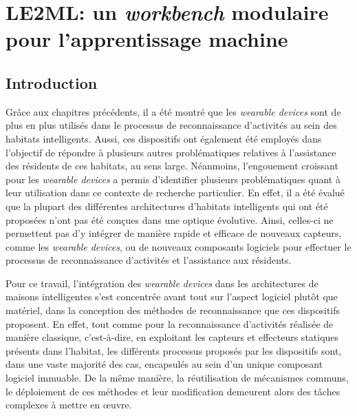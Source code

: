 \chapter{LE2ML: un \textit{workbench} modulaire pour l'apprentissage machine}
\label{chap:6}

\section{Introduction}

Grâce aux chapitres précédents, il a été montré que les \textit{wearable devices} sont de plus en plus utilisés dans le processus de reconnaissance d'activités au sein des habitats intelligents. Aussi, ces dispositifs ont également été employés dans l'objectif de répondre à plusieurs autres problématiques relatives à l'assistance des résidents de ces habitats, au sens large. Néanmoins, l'engouement croissant pour les \textit{wearable devices} a permis d'identifier plusieurs problématiques quant à leur utilisation dans ce contexte de recherche particulier. En effet, il a été évalué que la plupart des différentes architectures d'habitats intelligents qui ont été proposées n'ont pas été conçues dans une optique évolutive. Ainsi, celles-ci ne permettent pas d'y intégrer de manière rapide et efficace de nouveaux capteurs, comme les \textit{wearable devices}, ou de nouveaux composants logiciels pour effectuer le processus de reconnaissance d'activités et l'assistance aux résidents.

Pour ce travail, l'intégration des \textit{wearable devices} dans les architectures de maisons intelligentes s'est concentrée avant tout sur l'aspect logiciel plutôt que matériel, dans la conception des méthodes de reconnaissance que ces dispositifs proposent. En effet, tout comme pour la reconnaissance d'activités réalisée de manière classique, c'est-à-dire, en exploitant les capteurs et effecteurs statiques présents dans l'habitat, les différents processus proposés par les dispositifs sont, dans une vaste majorité des cas, encapsulés au sein d'un unique composant logiciel immuable. De la même manière, la réutilisation de mécanismes communs, le déploiement de ces méthodes et leur modification demeurent alors des tâches complexes à mettre en \oe{}uvre.

